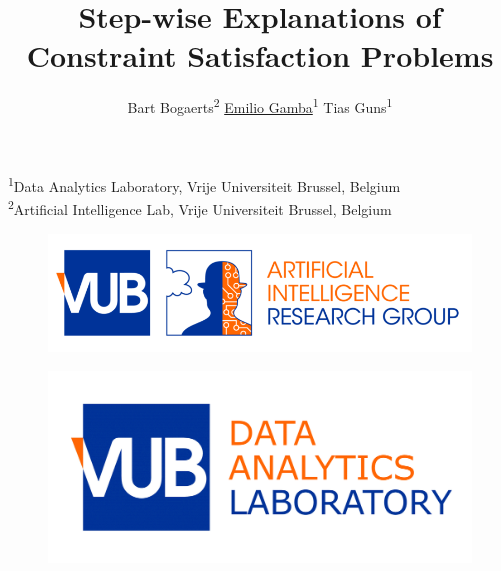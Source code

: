 \documentclass{beamer}
\title{Step-wise Explanations of Constraint Satisfaction Problems}
\author{ Bart Bogaerts\textsuperscript{2}  \hspace{0.5cm}\underline{Emilio Gamba}\textsuperscript{1} \hspace{0.5cm} Tias Guns\textsuperscript{1}}
\date{}
\begin{document}
\begin{frame}
    \maketitle
    \vspace{-2.5cm}
    \begin{center}
        {\small\textsuperscript{1}Data Analytics Laboratory, Vrije Universiteit Brussel, Belgium\\
            \textsuperscript{2}Artificial Intelligence Lab, Vrije Universiteit Brussel, Belgium}
    \end{center}

    \begin{minipage}[t]{0.48\linewidth}
        \centering
        \vspace{0.1cm}
        \begin{figure}[h]
            \includegraphics[width=\textwidth]{VUB-AI_RGB-1-800x223.png}
            \label{vub-logo}
        \end{figure}
    \end{minipage}\hfill
    \begin{minipage}[t]{0.48\linewidth}
        \centering
        \begin{figure}[h]
            \includegraphics[width=.68\textwidth]{figures/datalab}
            \label{vub-logo}
        \end{figure}

    \end{minipage}

\end{frame}
\end{document}
